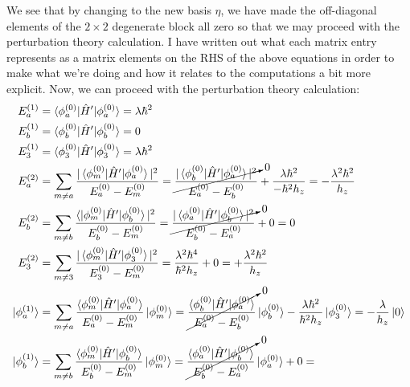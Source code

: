 \documentclass[10pt]{article}
\newcommand{\1}{\mathbf 1}
\begin{document}
We see that by changing to the new basis $\eta$, we have made the off-diagonal elements of the $2 \times 2$ degenerate block all zero so that we may proceed with the perturbation theory calculation.
I have written out what each matrix entry represents as a matrix elements on the RHS of the above equations in order to make what we're doing and how it relates to the computations a bit more explicit.
Now, we can proceed with the perturbation theory calculation:
\begin{align}
	E_a^{(1)}
	&=
	\braket{\phi_a^{(0)} | \hat H' | \phi_a^{(0)}}
	=
	\lambda\hbar^2
	\\
	E_b^{(1)}
	&=
	\braket{\phi_b^{(0)} | \hat H' | \phi_b^{(0)}}
	=
	0
	\\
	E_3^{(1)}
	&=
	\braket{\phi_3^{(0)} | \hat H' | \phi_3^{(0)}}
	=
	\lambda\hbar^2
	\\
	E_a^{(2)}
	&=
	\sum_{m \ne a}
	\frac{|\braket{\phi_m^{(0)} | \hat H' | \phi_a^{(0)}}|^2}{E_a^{(0)} - E_m^{(0)}}
	=
	\cancelto{0}{\frac{|\braket{\phi_b^{(0)} | \hat H' | \phi_a^{(0)}}|^2}{E_a^{(0)} - E_b^{(0)}}}
	+
	\frac{\lambda\hbar^2}{-\hbar^2 h_z}
	=
	-\frac{\lambda^2\hbar^2}{h_z}
	\\
	E_b^{(2)}
	&=
	\sum_{m \ne b}
	\frac{\braket{|\phi_m^{(0)} | \hat H' | \phi_b^{(0)}}|^2}{E_b^{(0)} - E_m^{(0)}}
	=
	\cancelto{0}{\frac{|\braket{\phi_a^{(0)} | \hat H' | \phi_b^{(0)}}|^2}{E_b^{(0)} - E_a^{(0)}}}
	+
	0
	=
	0
	\\
	E_3^{(2)}
	&=
	\sum_{m \ne 3}
	\frac{|\braket{\phi_m^{(0)} | \hat H' | \phi_3^{(0)}}|^2}{E_3^{(0)} - E_m^{(0)}}
	=
	\frac{\lambda^2\hbar^4}{\hbar^2 h_z}
	+
	0
	=
	+
	\frac{\lambda^2\hbar^2}{h_z}
	\\
	\ket{\phi^{(1)}_a}
	&=
	\sum_{m \ne a}
	\frac{\braket{\phi_m^{(0)} | \hat H' | \phi_a^{(0)}}}{E_a^{(0)} - E_m^{(0)}}
	\ket{\phi_m^{(0)}}
	=
	\cancelto{0}{\frac{\braket{\phi_b^{(0)} | \hat H' | \phi_a^{(0)}}}{E_a^{(0)} - E_b^{(0)}}}
	\ket{\phi_b^{(0)}}
	-
	\frac{\lambda\hbar^2}{\hbar^2 h_z}
	\ket{\phi_3^{(0)}}
	=
	-
	\frac{\lambda}{ h_z}
	\ket{0}
	\\
	\ket{\phi^{(1)}_b}
	&=
	\sum_{m \ne b}
	\frac{\braket{\phi_m^{(0)} | \hat H' | \phi_b^{(0)}}}{E_b^{(0)} - E_m^{(0)}}
	\ket{\phi_m^{(0)}}
	=
	\cancelto{0}{\frac{\braket{\phi_a^{(0)} | \hat H' | \phi_b^{(0)}}}{E_b^{(0)} - E_a^{(0)}}}
	\ket{\phi_a^{(0)}}
	+
	0
	=

\end{align}
\end{document}
